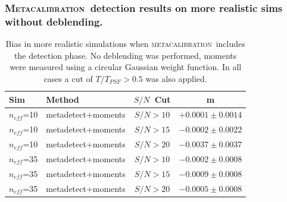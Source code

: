 \documentclass{beamer}
\newcommand{\mcal}{\textsc{metacalibration}}
\newcommand{\Mcal}{\textsc{Metacalibration}}
\newcommand{\snr}{$S/N$}
\newcommand{\neff}{$n_{eff}$}
\begin{document}
\begin{frame}
    \frametitle{\Mcal\ detection results on more realistic sims without deblending.}

 
    \begin{table}
        \centering
        \begin{tabular}{|l|l|c|c|}
            \hline
            Sim & Method         & \snr\ Cut & m             \\
            \hline

            \hline
            \neff=10    & metadetect+moments    & \snr$ > 10$ & $+0.0001 \pm 0.0014$  \\
            \neff=10    & metadetect+moments    & \snr$ > 15$ & $-0.0002 \pm 0.0022$  \\
            \neff=10    & metadetect+moments    & \snr$ > 20$ & $-0.0037 \pm 0.0037$  \\
            \hline
            \neff={\color{brightred}35}    & metadetect+moments    & \snr$ > 10$ & $-0.0002 \pm 0.0008$  \\
            \neff={\color{brightred}35}    & metadetect+moments    & \snr$ > 15$ & $-0.0009 \pm 0.0008$  \\
            \neff={\color{brightred}35}    & metadetect+moments    & \snr$ > 20$ & $-0.0005 \pm 0.0008$  \\
            \hline

        \end{tabular}
        \caption{Bias in more realistic simulations when \mcal\ includes
            the detection phase.  No deblending was performed, 
            moments were measured using a circular Gaussian weight function.
            In all cases a cut of $T/T_{PSF} > 0.5$ was also applied.
        \label{tab:mcal:deblending}}
    \end{table}


\end{frame}
\end{document}
